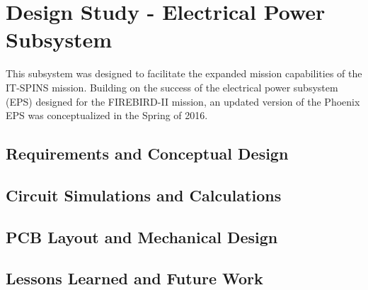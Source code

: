 \chapter{Design Study - Electrical Power Subsystem}\label{CH:Design2}
This subsystem was designed to facilitate the expanded mission capabilities of the IT-SPINS mission. Building on the success of the electrical power subsystem (EPS) designed for the FIREBIRD-II mission, an updated version of the Phoenix EPS was conceptualized in the Spring of 2016. 

\section{Requirements and Conceptual Design}\label{Sect:test}



\section{Circuit Simulations and Calculations}\label{Sect:test}



\section{PCB Layout and Mechanical Design}\label{Sect:test}



\section{Lessons Learned and Future Work}\label{Sect:test}